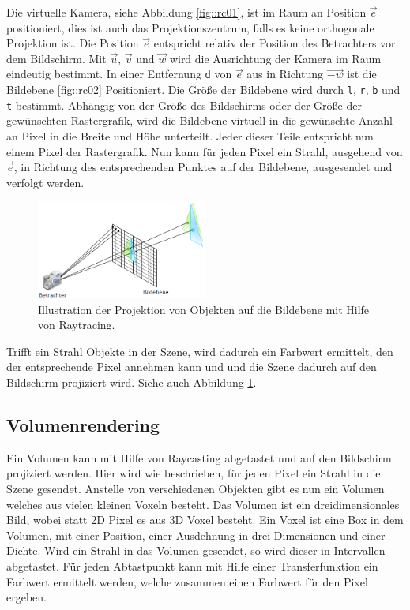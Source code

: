 Die virtuelle Kamera, siehe Abbildung \ref{fig::rc01}, ist im Raum an Position $\vec{e}$ positioniert, dies ist auch das Projektionszentrum, falls es keine orthogonale Projektion ist.
Die Position $\vec{e}$ entspricht relativ der Position des Betrachters vor dem Bildschirm.
Mit $\vec{u}$, $\vec{v}$ und $\vec{w}$ wird die Ausrichtung der Kamera im Raum eindeutig bestimmt.
In einer Entfernung \texttt{d} von $\vec{e}$ aus in Richtung $\vec{-w}$ ist die Bildebene \ref{fig::rc02} Positioniert.
Die Größe der Bildebene wird durch \texttt{l}, \texttt{r}, \texttt{b} und \texttt{t} bestimmt.
Abhängig von der Größe des Bildschirms oder der Größe der gewünschten Rastergrafik, wird die Bildebene virtuell in die gewünschte Anzahl an Pixel in die Breite und Höhe unterteilt.
Jeder dieser Teile entspricht nun einem Pixel der Rastergrafik.
Nun kann für jeden Pixel ein Strahl, ausgehend von $\vec{e}$, in Richtung des entsprechenden Punktes auf der Bildebene, ausgesendet und verfolgt werden.
\begin{figure}
	\centering
	\includegraphics[width=0.5\textwidth]{../../Grafiken/Raytracing.png}
	\caption{Illustration der Projektion von Objekten auf die Bildebene mit Hilfe von Raytracing. \cite{Dr.MichaelKrone2016/2017}}
	\label{fig::rc03}
\end{figure}
Trifft ein Strahl Objekte in der Szene, wird dadurch ein Farbwert ermittelt, den der entsprechende Pixel annehmen kann und und die Szene dadurch auf den Bildschirm projiziert wird.
Siehe auch Abbildung \ref{fig::rc03}.

\subsection{Volumenrendering}
Ein Volumen kann mit Hilfe von Raycasting abgetastet und auf den Bildschirm projiziert werden.
Hier wird wie beschrieben, für jeden Pixel ein Strahl in die Szene gesendet.
Anstelle von verschiedenen Objekten gibt es nun ein Volumen welches aus vielen kleinen Voxeln besteht.
Das Volumen ist ein dreidimensionales Bild, wobei statt 2D Pixel es aus 3D Voxel besteht.
Ein Voxel ist eine Box in dem Volumen, mit einer Position, einer Ausdehnung in drei Dimensionen und einer Dichte.
Wird ein Strahl in das Volumen gesendet, so wird dieser in Intervallen abgetastet.
Für jeden Abtastpunkt kann mit Hilfe einer Transferfunktion ein Farbwert ermittelt werden, welche zusammen einen Farbwert für den Pixel ergeben.

